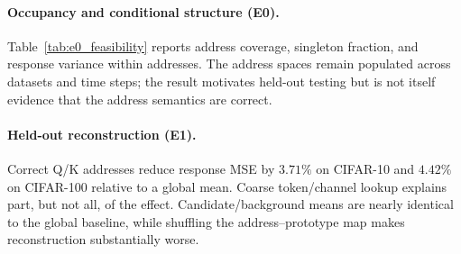\paragraph{Occupancy and conditional structure (E0).}
Table~\ref{tab:e0_feasibility} reports address coverage, singleton fraction,
and response variance within addresses. The address spaces remain populated
across datasets and time steps; the result motivates held-out testing but is
not itself evidence that the address semantics are correct.

\begin{table}[t]
\centering
\footnotesize
{}
\caption{E0 feasibility diagnostics. Coverage measures occupied mixed-radix
addresses; it is not a hash-collision statistic. Conditional variance measures
response dispersion within an address.}
\label{tab:e0_feasibility}
\end{table}

\paragraph{Held-out reconstruction (E1).}
Correct Q/K addresses reduce response MSE by $3.71\%$ on CIFAR-10 and
$4.42\%$ on CIFAR-100 relative to a global mean. Coarse token/channel lookup
explains part, but not all, of the effect. Candidate/background means are nearly
identical to the global baseline, while shuffling the address--prototype map
makes reconstruction substantially worse.

\begin{table}[t]
\centering
\footnotesize
{}
\caption{E1 held-out relative MSE reduction (\%) against the global mean.
Correct addresses outperform coarse lookup, while shuffled assignment preserves
table capacity but destroys the gain.}
\label{tab:e1_recon}
\end{table}

